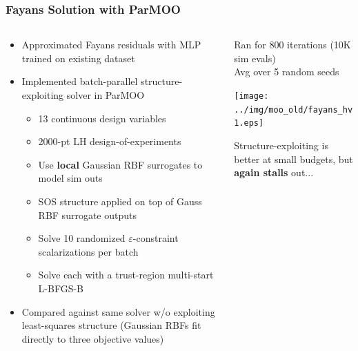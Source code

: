 \documentclass[aspectratio=169]{beamer}
\begin{document}
\begin{frame}\frametitle{Fayans Solution with ParMOO}
\begin{columns}
\begin{column}{0.55\textwidth}
\begin{itemize}
\item Approximated Fayans residuals with MLP trained on existing dataset
\item Implemented batch-parallel
{\color{blue} structure-exploiting solver in ParMOO}
\begin{itemize}
\item 13 continuous design variables
\item 2000-pt LH design-of-experiments
\item Use {\bf local} Gaussian RBF surrogates to model sim outs
\item SOS structure applied on top of Gauss RBF surrogate outputs
\item Solve 10 randomized $\varepsilon$-constraint scalarizations per batch
\item Solve each with a trust-region
multi-start L-BFGS-B
\end{itemize}
\item Compared against
{\color{red} same solver w/o exploiting least-squares structure}
(Gaussian RBFs fit directly to three objective values)
\end{itemize}
\end{column}
\begin{column}{0.45\textwidth}
Ran for 800 iterations (10K sim evals)\\
Avg over 5 random seeds\\

\bigskip

\texttt{[image: ../img/moo\_old/fayans\_hv1.eps]}\\

\bigskip

Structure-exploiting is better at small budgets, but {\bf again stalls} out...
\end{column}
\end{columns}
\end{frame}
\end{document}
